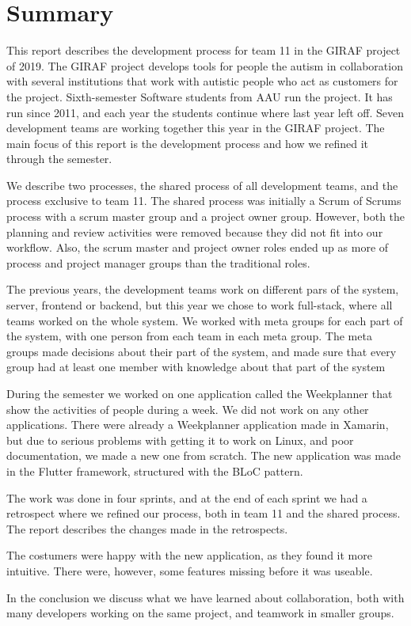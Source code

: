 \section{Summary}

This report describes the development process for team 11 in the GIRAF project of 2019. The GIRAF project develops tools for people the autism in collaboration with several institutions that work with autistic people who act as customers for the project. Sixth-semester Software students from AAU run the project. It has run since 2011, and each year the students continue where last year left off. Seven development teams are working together this year in the GIRAF project. The main focus of this report is the development process and how we refined it through the semester.

We describe two processes, the shared process of all development teams, and the process exclusive to team 11. The shared process was initially a Scrum of Scrums process with a scrum master group and a project owner group. However, both the planning and review activities were removed because they did not fit into our workflow. Also, the scrum master and project owner roles ended up as more of process and project manager groups than the traditional roles. 

The previous years, the development teams work on different pars of the system, server, frontend or backend, but this year we chose to work full-stack, where all teams worked on the whole system. We worked with meta groups for each part of the system, with one person from each team in each meta group. The meta groups made decisions about their part of the system, and made sure that every group had at least one member with knowledge about that part of the system 

During the semester we worked on one application called the Weekplanner that show the activities of people during a week. We did not work on any other applications. There were already a Weekplanner application made in Xamarin, but due to serious problems with getting it to work on Linux, and poor documentation, we made a new one from scratch. The new application was made in the Flutter framework, structured with the BLoC pattern. 

The work was done in four sprints, and at the end of each sprint we had a retrospect where we refined our process, both in team 11 and the shared process. The report describes the changes made in the retrospects.

The costumers were happy with the new application, as they found it more intuitive. There were, however, some features missing before it was useable. 

In the conclusion we discuss what we have learned about collaboration, both with many developers working on the same project, and teamwork in smaller groups. 

